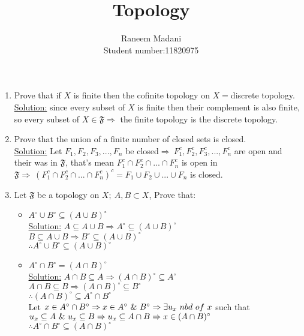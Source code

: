\documentclass[fleqn,a4paper,12pt,towside]{article}
\title{{\huge Topology}}
\author{\Large Raneem Madani\\Student number:11820975}
\begin{document}
\maketitle
\begin{enumerate}
    \item Prove that if $X$ is finite then the cofinite topology on $X=$discrete topology.\\
    {\color{red}\underline{Solution:}} since every subset of $X$ is finite then their complement is also finite, so every subset of $X\in\mathfrak{F}\Rightarrow$ the finite topology is the discrete topology. \\
    \noindent{\color{red}\rule{\linewidth}{.3mm}}
     \item Prove that the union of a finite number of closed sets is closed.\\
    {\color{red}\underline{Solution:}} Let $F_1,F_2,F_3,...,F_n$ be closed$\Rightarrow~F_1^c,F_2^c,F_3^c,...,F_n^c$ are open and their was in $\mathfrak{F}$, that's mean $F_1^c\cap F_2^c \cap...\cap F_n^c$ is open in $\mathfrak{F}\Rightarrow~(F_1^c\cap F_2^c\cap...\cap F_n^c)^c=F_1\cup F_2\cup...\cup F_n$ is closed.\\
    \noindent{\color{red}\rule{\linewidth}{.3mm}}
     \item Let $\mathfrak{F}$ be a topology on $X;~A,B\subset X$, Prove that:
     \begin{itemize}
         \item $A^\circ\cup B^\circ\subseteq(A\cup B)^\circ$\\
             {\color{red}\underline{Solution:}}
             $A\subseteq A\cup B\Rightarrow A^\circ\subseteq (A\cup B)^\circ$\\
             $B\subseteq A\cup B\Rightarrow B^\circ\subseteq(A\cup B)^\circ$\\
             $\therefore A^\circ\cup B^\circ \subseteq(A\cup B)^\circ$
         \item $A^\circ \cap B^\circ=(A\cap B)^\circ$\\
             {\color{red}\underline{Solution:}}
             $A\cap B\subseteq A\Rightarrow (A\cap B)^\circ\subseteq A^\circ$\\
            $A\cap B\subseteq B\Rightarrow (A\cap B)^\circ\subseteq B^\circ$\\
            $\therefore (A\cap B)^\circ\subseteq A^\circ\cap B^\circ$\\
            Let $x\in A^\circ\cap B^\circ\Rightarrow x \in A^\circ~\&~B^\circ\\
            \Rightarrow \exists u_x~nbd~of~x$ such that $u_x\subseteq A~\&~u_x\subseteq B\\
            \Rightarrow u_x\subseteq A\cap B\Rightarrow x\in (A\cap B)^\circ$\\
            $\therefore A^\circ\cap B^\circ\subseteq (A\cap B)^\circ$
            

\end{itemize}
\end{enumerate}
\end{document}
